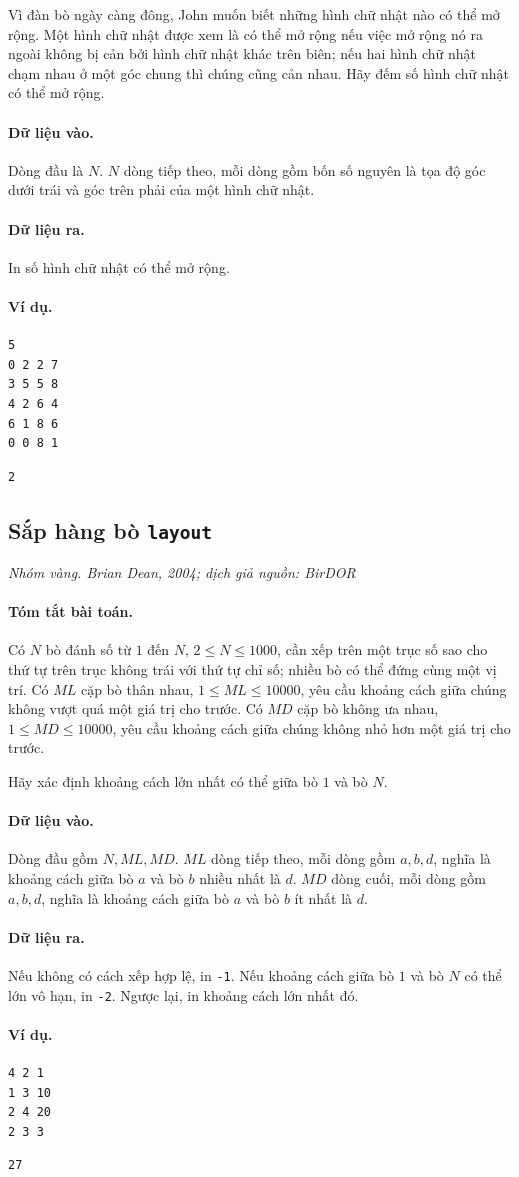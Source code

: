 \documentclass[11pt]{article}
\newcommand{\problem}[4]{%
  \subsection[#1 (#2)]{#1 \hfill {\normalsize\texttt{#2}}}%
  \noindent\textit{#3. #4}\par\smallskip
}
\newcommand{\iosec}[1]{\paragraph{#1}}
\begin{document}
Vì đàn bò ngày càng đông, John muốn biết những hình chữ nhật nào có thể mở
rộng. Một hình chữ nhật được xem là có thể mở rộng nếu việc mở rộng nó ra
ngoài không bị cản bởi hình chữ nhật khác trên biên; nếu hai hình chữ nhật
chạm nhau ở một góc chung thì chúng cũng cản nhau. Hãy đếm số hình chữ nhật
có thể mở rộng.

\iosec{Dữ liệu vào.}
Dòng đầu là \(N\). \(N\) dòng tiếp theo, mỗi dòng gồm bốn số nguyên là tọa độ
góc dưới trái và góc trên phải của một hình chữ nhật.

\iosec{Dữ liệu ra.}
In số hình chữ nhật có thể mở rộng.

\iosec{Ví dụ.}
\begin{verbatim}
5
0 2 2 7
3 5 5 8
4 2 6 4
6 1 8 6
0 0 8 1
\end{verbatim}

\begin{verbatim}
2
\end{verbatim}

\problem{Sắp hàng bò}{layout}{Nhóm vàng}{Brian Dean, 2004; dịch giả nguồn: BirDOR}

\iosec{Tóm tắt bài toán.}
Có \(N\) bò đánh số từ \(1\) đến \(N\), \(2\le N\le 1000\), cần xếp trên một
trục số sao cho thứ tự trên trục không trái với thứ tự chỉ số; nhiều bò có thể
đứng cùng một vị trí. Có \(ML\) cặp bò thân nhau, \(1\le ML\le 10000\), yêu
cầu khoảng cách giữa chúng không vượt quá một giá trị cho trước. Có \(MD\)
cặp bò không ưa nhau, \(1\le MD\le 10000\), yêu cầu khoảng cách giữa chúng
không nhỏ hơn một giá trị cho trước.

Hãy xác định khoảng cách lớn nhất có thể giữa bò \(1\) và bò \(N\).

\iosec{Dữ liệu vào.}
Dòng đầu gồm \(N,ML,MD\). \(ML\) dòng tiếp theo, mỗi dòng gồm \(a,b,d\), nghĩa
là khoảng cách giữa bò \(a\) và bò \(b\) nhiều nhất là \(d\). \(MD\) dòng cuối,
mỗi dòng gồm \(a,b,d\), nghĩa là khoảng cách giữa bò \(a\) và bò \(b\) ít nhất
là \(d\).

\iosec{Dữ liệu ra.}
Nếu không có cách xếp hợp lệ, in \texttt{-1}. Nếu khoảng cách giữa bò \(1\) và
bò \(N\) có thể lớn vô hạn, in \texttt{-2}. Ngược lại, in khoảng cách lớn
nhất đó.

\iosec{Ví dụ.}
\begin{verbatim}
4 2 1
1 3 10
2 4 20
2 3 3
\end{verbatim}

\begin{verbatim}
27
\end{verbatim}
\end{document}
